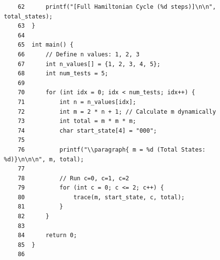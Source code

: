 \begin{verbatim}
    62	    printf("[Full Hamiltonian Cycle (%d steps)]\n\n", total_states);
    63	}
    64	
    65	int main() {
    66	    // Define n values: 1, 2, 3
    67	    int n_values[] = {1, 2, 3, 4, 5};
    68	    int num_tests = 5;
    69	
    70	    for (int idx = 0; idx < num_tests; idx++) {
    71	        int n = n_values[idx];
    72	        int m = 2 * n + 1; // Calculate m dynamically
    73	        int total = m * m * m;
    74	        char start_state[4] = "000";
    75	
    76	        printf("\\paragraph{ m = %d (Total States: %d)}\n\n\n", m, total);
    77	        
    78	        // Run c=0, c=1, c=2
    79	        for (int c = 0; c <= 2; c++) {
    80	            trace(m, start_state, c, total);
    81	        }
    82	    }
    83	
    84	    return 0;
    85	}
    86	
\end{verbatim}
